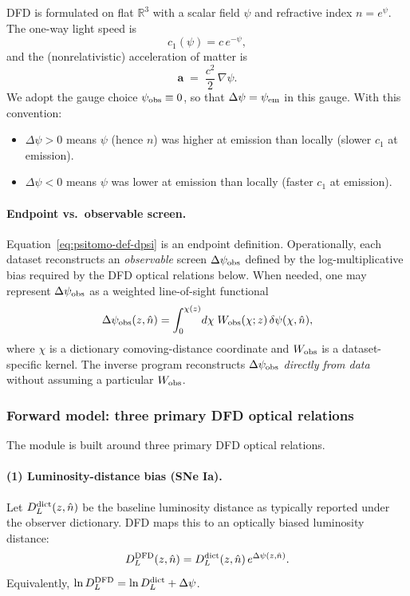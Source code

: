 DFD is formulated on flat $\mathbb{R}^3$ with a scalar field $\psi$ and refractive index $n=e^\psi$.
The one-way light speed is
\begin{equation}
c_1(\psi)=c\,e^{-\psi},
\end{equation}
and the (nonrelativistic) acceleration of matter is
\begin{equation}
\bm a \;=\;\frac{c^2}{2}\,\nabla\psi.
\label{eq:psitomo-accel}
\end{equation}
We adopt the gauge choice $\psi_{\rm obs}\equiv 0$, so that $\Delta\psi=\psi_{\rm em}$ in this gauge. With this convention:
\begin{itemize}
\item $\Delta\psi>0$ means $\psi$ (hence $n$) was higher at emission than locally (slower $c_1$ at emission).
\item $\Delta\psi<0$ means $\psi$ was lower at emission than locally (faster $c_1$ at emission).
\end{itemize}

\paragraph{Endpoint vs.\ observable screen.}
Equation~\eqref{eq:psitomo-def-dpsi} is an endpoint definition.
Operationally, each dataset reconstructs an \emph{observable} screen $\Delta\psi_{\rm obs}$ defined by the log-multiplicative bias required by the DFD optical relations below.
When needed, one may represent $\Delta\psi_{\rm obs}$ as a weighted line-of-sight functional
\begin{equation}
\Delta\psi_{\rm obs}(z,\hat n)
=\int_{0}^{\chi(z)}\!d\chi\;W_{\rm obs}(\chi;z)\,\delta\psi(\chi,\hat n),
\label{eq:psitomo-los-functional}
\end{equation}
where $\chi$ is a dictionary comoving-distance coordinate and $W_{\rm obs}$ is a dataset-specific kernel.
The inverse program reconstructs $\Delta\psi_{\rm obs}$ \emph{directly from data} without assuming a particular $W_{\rm obs}$.

\subsubsection{Forward model: three primary DFD optical relations}

The module is built around three primary DFD optical relations.

\paragraph{(1) Luminosity-distance bias (SNe Ia).}
Let $D_L^{\rm dict}(z,\hat n)$ be the baseline luminosity distance as typically reported under the observer dictionary.
DFD maps this to an optically biased luminosity distance:
\begin{equation}
D_L^{\rm DFD}(z,\hat n)=D_L^{\rm dict}(z,\hat n)\,e^{\Delta\psi(z,\hat n)}.
\label{eq:psitomo-DL-bias}
\end{equation}
Equivalently, $\ln D_L^{\rm DFD}=\ln D_L^{\rm dict}+\Delta\psi$.

